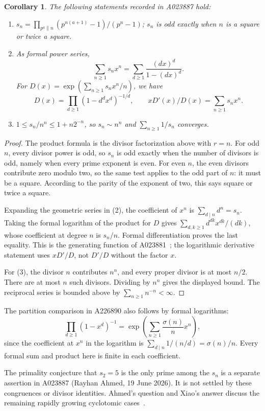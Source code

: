\documentclass[11pt]{article}
\newtheorem{corollary}[theorem]{Corollary}
\begin{document}
\begin{corollary}\label{cor:divisors}
The following statements recorded in A023887 hold:
\begin{enumerate}
\item $s_n=\prod_{p^a\parallel n}(p^{n(a+1)}-1)/(p^n-1)$;
$s_n$ is odd exactly when $n$ is a square or twice a square.
\item As formal power series,
\[
 \sum_{n\geq1}s_nx^n=\sum_{d\geq1}\frac{(dx)^d}{1-(dx)^d}.
\]
For $D(x)=\exp(\sum_{n\geq1}s_nx^n/n)$, we have
\[
 D(x)=\prod_{d\geq1}(1-d^dx^d)^{-1/d},\qquad
 xD'(x)/D(x)=\sum_{n\geq1}s_nx^n.
\]
\item $1\leq s_n/n^n\leq1+n2^{-n}$, so $s_n\sim n^n$
and $\sum_{n\geq1}1/s_n$ converges.
\end{enumerate}
\end{corollary}
\begin{proof}
The product formula is the divisor factorization above with $r=n$.
For odd $n$, every divisor power is odd, so $s_n$ is odd exactly when
the number of divisors is odd, namely when every prime exponent is even.
For even $n$, the even divisors contribute zero modulo two, so the same
test applies to the odd part of $n$: it must be a square. According to
the parity of the exponent of two, this says square or twice a square.

Expanding the geometric series in (2), the coefficient of $x^n$ is
$\sum_{d\mid n}d^n=s_n$. Taking the formal logarithm of the product for
$D$ gives $\sum_{d,k\geq1}d^{dk}x^{dk}/(dk)$, whose coefficient at degree
$n$ is $s_n/n$. Formal differentiation proves the last equality.
This is the generating function of A023881~\cite{expanding}; the logarithmic
derivative statement uses $xD'/D$, not $D'/D$ without the factor $x$.

For (3), the divisor $n$ contributes $n^n$, and every proper divisor
is at most $n/2$. There are at most $n$ such divisors. Dividing by $n^n$
gives the displayed bound. The reciprocal series is bounded above by
$\sum_{n\geq1}n^{-n}<\infty$.
\end{proof}

The partition comparison in A226890 also follows by formal logarithms:
\[
 \prod_{d\geq1}(1-x^d)^{-1}
 =\exp\!\left(\sum_{n\geq1}\frac{\sigma(n)}{n}x^n\right),
\]
since the coefficient at $x^n$ in the logarithm is
$\sum_{d\mid n}1/(n/d)=\sigma(n)/n$.
Every formal sum and product here is finite in each coefficient.

The primality conjecture that $s_2=5$ is the only prime among the $s_n$
is a separate assertion in A023887 (Rayhan Ahmed, 19 June 2026).
It is not settled by these congruences or divisor identities. Ahmed's
question and Xiao's answer discuss the remaining rapidly growing
cyclotomic cases~\cite{primality}.
\end{document}
